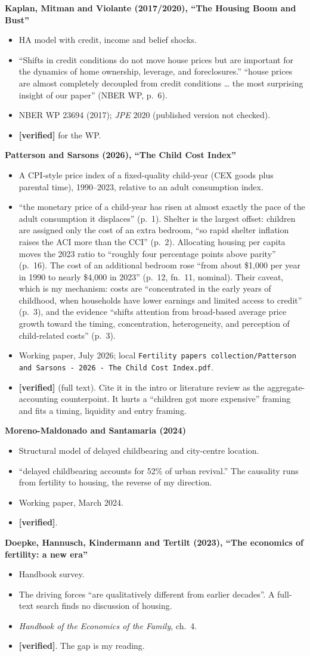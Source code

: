 \documentclass[10pt]{article}
\newcommand{\ok}{\textcolor{green!45!black}{\textbf{[verified]}}}
\newcommand{\entry}[5]{%
  \textbf{#1}\par
  \begin{itemize}
    \item #2
    \item #3
    \item #4
    \item #5
  \end{itemize}}
\begin{document}
\entry{Kaplan, Mitman and Violante (2017/2020), ``The Housing Boom and Bust''}
{HA model with credit, income and belief shocks.}
{``Shifts in credit conditions do not move house prices but are important for the dynamics of home ownership, leverage, and foreclosures.'' ``house prices are almost completely decoupled from credit conditions \ldots{} the most surprising insight of our paper'' (NBER WP, p.~6).}
{NBER WP 23694 (2017); \emph{JPE} 2020 (published version not checked).}
{\ok{} for the WP.}

\entry{Patterson and Sarsons (2026), ``The Child Cost Index''}
{A CPI-style price index of a fixed-quality child-year (CEX goods plus parental time), 1990--2023, relative to an adult consumption index.}
{``the monetary price of a child-year has risen at almost exactly the pace of the adult consumption it displaces'' (p.~1). Shelter is the largest offset: children are assigned only the cost of an extra bedroom, ``so rapid shelter inflation raises the ACI more than the CCI'' (p.~2). Allocating housing per capita moves the 2023 ratio to ``roughly four percentage points above parity'' (p.~16). The cost of an additional bedroom rose ``from about \$1,000 per year in 1990 to nearly \$4,000 in 2023'' (p.~12, fn.~11, nominal). Their caveat, which is my mechanism: costs are ``concentrated in the early years of childhood, when households have lower earnings and limited access to credit'' (p.~3), and the evidence ``shifts attention from broad-based average price growth toward the timing, concentration, heterogeneity, and perception of child-related costs'' (p.~3).}
{Working paper, July 2026; local \texttt{Fertility papers collection/Patterson and Sarsons - 2026 - The Child Cost Index.pdf}.}
{\ok{} (full text). Cite it in the intro or literature review as the aggregate-accounting counterpoint. It hurts a ``children got more expensive'' framing and fits a timing, liquidity and entry framing.}

\entry{Moreno-Maldonado and Santamaria (2024)}
{Structural model of delayed childbearing and city-centre location.}
{``delayed childbearing accounts for 52\% of urban revival.'' The causality runs from fertility to housing, the reverse of my direction.}
{Working paper, March 2024.}
{\ok.}

\entry{Doepke, Hannusch, Kindermann and Tertilt (2023), ``The economics of fertility: a new era''}
{Handbook survey.}
{The driving forces ``are qualitatively different from earlier decades''. A full-text search finds no discussion of housing.}
{\emph{Handbook of the Economics of the Family}, ch.~4.}
{\ok. The gap is my reading.}
\end{document}
